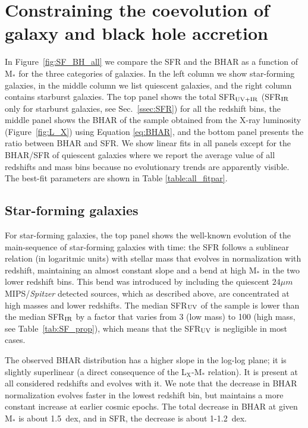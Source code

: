 \section{Constraining the coevolution of galaxy and black hole accretion} \label{sec:BH_SF}
In Figure~\ref{fig:SF_BH_all} we compare the SFR and the BHAR as a function of M$_*$ for the three categories of galaxies.
In the left column we show star-forming galaxies, in the middle column we list quiescent galaxies, and the right column contains starburst galaxies. 
The top panel shows the total SFR$_{\rm UV+IR}$ (SFR$_{\rm IR}$ only for starburst galaxies, see Sec.~\ref{ssec:SFR}) for all the redshift bins, the middle panel shows the BHAR of the sample obtained from the X-ray luminosity (Figure~\ref{fig:L_X}) using Equation \ref{eq:BHAR}, and the bottom panel presents the ratio between BHAR and SFR. 
We show linear fits in all panels except for the BHAR/SFR of quiescent galaxies where we report the average value of all redshifts and mass bins because no evolutionary trends are apparently visible.
The best-fit parameters are shown in Table \ref{table:all_fitpar}.

\subsection{Star-forming galaxies}
        For star-forming galaxies, the top panel shows the well-known evolution of the main-sequence of star-forming galaxies with time: the SFR follows a sublinear relation (in logaritmic units) with stellar mass that evolves in normalization with redshift, maintaining an almost constant slope and a bend at high M$_*$ in the two lower redshift bins. This bend was introduced by including the quiescent $24\mu m$ MIPS/\textit{Spitzer} detected sources, which as described above, are concentrated at high masses and lower redshifts. The median SFR$_{\rm UV}$ of the sample is  lower than the median SFR$_{\rm IR}$ by a factor that varies from 3 (low mass) to 100 (high mass, see Table~\ref{tab:SF_prop}), which means that the SFR$_{\rm UV}$ is negligible in most cases.

The observed BHAR distribution has a higher slope in the log-log plane; it is slightly superlinear 
(a direct consequence of the L$_\text{X}$-M$_*$ relation). 
    It is present at all considered redshifts and evolves with it.
    We note that the decrease in BHAR normalization evolves faster in the lowest redshift bin, but maintains a more constant increase at earlier cosmic epochs. The total decrease in BHAR at given M$_*$ is about 1.5~dex, and in SFR, the decrease is about 1-1.2~dex.


